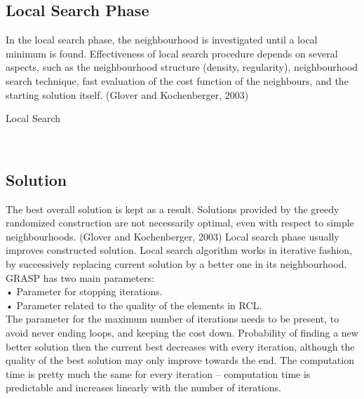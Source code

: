 \documentclass[12pt]{article}
\begin{document}
\subsection {Local Search Phase}

In the local search phase, the neighbourhood is investigated until a local minimum is found. Effectiveness of local search procedure depends on several aspects, such as the neighbourhood structure (density, regularity), neighbourhood search technique, fast evaluation of the cost function of the neighbours, and the starting solution itself. (Glover and Kochenberger, 2003)

\begin{algorithm}
\caption{ Local Search}
\\
\begin {algorithmic}
\EndWhile
\State {}

\end{algorithmic}
\end{algorithm}
\subsection{ Solution }
The best overall solution is kept as a result. Solutions provided by the greedy randomized construction are not necessarily optimal, even with respect to simple neighbourhoods. (Glover and Kochenberger, 2003) Local search phase usually improves constructed solution. Local search algorithm works in iterative fashion, by successively replacing current solution by a better one in its neighbourhood.\\
GRASP has two main parameters:\\
\indent •	Parameter for stopping iterations.\\
\indent•	Parameter related to the quality of the elements in RCL.\\
The parameter for the maximum number of iterations needs to be present, to avoid never ending loops, and keeping the cost down.
Probability of finding a new better solution then the current best decreases with every iteration, although the quality of the best solution may only improve towards the end. The computation time is pretty much the same for every iteration – computation time is predictable and increases linearly with the number of iterations.
\end{document}
